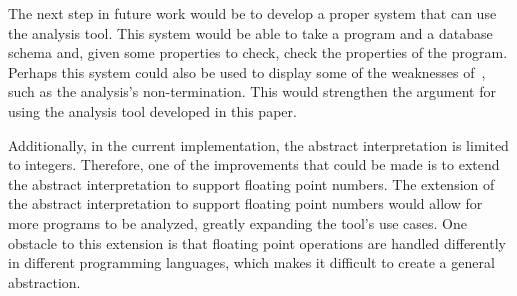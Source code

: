 The next step in future work would be to develop a proper system that can use the analysis tool. This system would be able to take a program and a database schema and, given some properties to check, check the properties of the program.
Perhaps this system could also be used to display some of the weaknesses of~\cite{halder_abstract_2012}, such as the analysis's non-termination. This would strengthen the argument for using the analysis tool developed in this paper.

Additionally, in the current implementation, the abstract interpretation is limited to integers. Therefore, one of the improvements that could be made is to extend the abstract interpretation to support floating point numbers.
The extension of the abstract interpretation to support floating point numbers would allow for more programs to be analyzed, greatly expanding the tool's use cases.
One obstacle to this extension is that floating point operations are handled differently in different programming languages, which makes it difficult to create a general abstraction.







